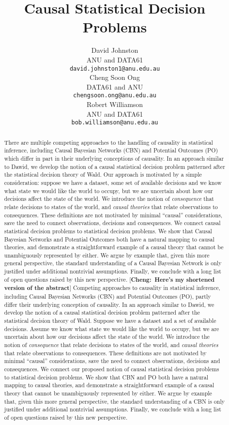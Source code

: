\documentclass{article}
\title{Causal Statistical Decision Problems}
\author{%
  David Johnston \\
    ANU and DATA61\\
  \texttt{david.johnston1@anu.edu.au} \\
   \And
  Cheng Soon Ong\\
  DATA61 and ANU\\
  \texttt{chengsoon.ong@anu.edu.au} \\
   \And
   Robert Williamson \\
   ANU and DATA61\\
   \texttt{bob.williamson@anu.edu.au} \\
}
\theoremstyle{plain}
\theoremstyle{definition}
\newcommand{\cheng}[1]{ {\color{purple}[{\bf Cheng:~{#1}}]} }
\begin{document}
\maketitle

\begin{abstract}
There are multiple competing approaches to the handling of causality in statistical inference, including Causal Bayesian Networks (CBN) and Potential Outcomes (PO) which differ in part in their underlying conceptions of causality. In an approach similar to Dawid, we develop the notion of a causal statistical decision problem patterned after the statistical decision theory of Wald. Our approach is motivated by a simple consideration: suppose we have a dataset, some set of available decisions and we know what state we would like the world to occupy, but we are uncertain about how our decisions affect the state of the world. We introduce the notion of \emph{consequence } that relate decisions to states of the world, and \emph{causal theories} that relate observations to consequences. These definitions are not motivated by minimal ``causal'' considerations, save the need to connect observations, decisions and consequences. We connect causal statistical decision problems to statistical decision problems. We show that Causal Bayesian Networks and Potential Outcomes both have a natural mapping to causal theories, and demonstrate a straightforward example of a causal theory that cannot be unambiguously represented by either. We argue by example that, given this more general perspective, the standard understanding of a Causal Bayesian Network is only justified under additional nontrivial assumptions. Finally, we conclude with a long list of open questions raised by this new perspective.
\cheng{Here's my shortened version of the abstract}
Competing approaches to causality in statistical inference, including Causal Bayesian Networks (CBN) and Potential Outcomes (PO), partly differ their underlying conception of causality. In an approach similar to Dawid, we develop the notion of a causal statistical decision problem patterned after the statistical decision theory of Wald. Suppose we have a dataset and a set of available decisions. Assume we know what state we would like the world to occupy, but we are uncertain about how our decisions affect the state of the world. We introduce the notion of \emph{consequence} that relate decisions to states of the world, and \emph{causal theories} that relate observations to consequences. These definitions are not motivated by minimal ``causal'' considerations, save the need to connect observations, decisions and consequences. We connect our proposed notion of causal statistical decision problems to statistical decision problems. We show that CBN and PO both have a natural mapping to causal theories, and demonstrate a straightforward example of a causal theory that cannot be unambiguously represented by either. We argue by example that, given this more general perspective, the standard understanding of a CBN is only justified under additional nontrivial assumptions. Finally, we conclude with a long list of open questions raised by this new perspective.


\end{abstract}
\end{document}
